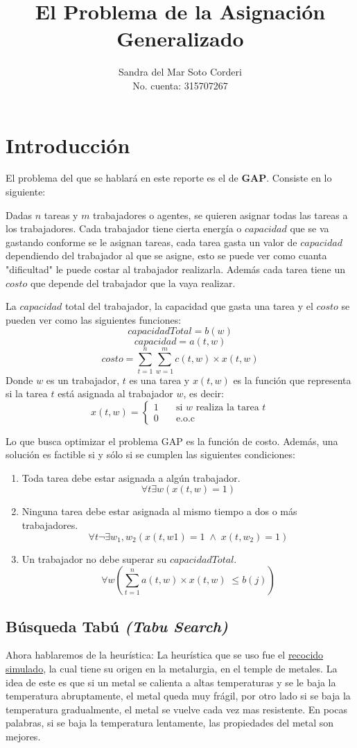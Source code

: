 \documentclass{article}
\title{El Problema de la Asignación Generalizado}
\author{
  Sandra del Mar Soto Corderi\\
  No. cuenta: 315707267
}
\date{}
\begin{document}
\maketitle

\section{Introducción}

El problema del que se hablará en este reporte es el de \textbf{GAP}. Consiste en lo
siguiente:

Dadas $n$ tareas y $m$ trabajadores o agentes, se quieren asignar todas las tareas
a los trabajadores. Cada trabajador tiene cierta energía o $capacidad$ que se va
gastando conforme se le asignan tareas, cada tarea gasta un valor de $capacidad$
dependiendo del trabajador al que se asigne, esto se puede ver como cuanta "dificultad" le puede costar al trabajador realizarla.
Además cada tarea tiene un $costo$ que depende del trabajador que la vaya realizar.

La $capacidad$ total del trabajador, la capacidad que gasta una tarea y el $costo$ 
se pueden ver como las siguientes funciones:
\[capacidadTotal=b(w)\]
\[capacidad=a(t,w)\] 
\[costo=\sum_{t=1}^{n}\sum_{w=1}^{m}c(t,w)\times x(t,w)\]
Donde $w$ es un trabajador, $t$ es una tarea y $x(t,w)$ es la función que 
representa si la tarea $t$ está asignada al trabajador $w$, es decir:
\[x(t,w)=
\begin{cases}
\text{1}&\quad\text{si $w$ realiza la tarea $t$}\\
\text{0}&\quad\text{e.o.c}
\end{cases}\]

Lo que busca optimizar el problema GAP es la función de costo.
Además, una solución es factible si y sólo si se cumplen las siguientes 
condiciones:
\begin{enumerate}
	\item Toda tarea debe estar asignada a algún trabajador.
	\[\forall t \exists w (x(t,w)=1)\]
	\item Ninguna tarea debe estar asignada al mismo tiempo a dos o más 
	trabajadores.
	\[\forall t \neg \exists w_1,w_2 (x(t,w1)=1 \;\wedge \; x(t,w_2)=1)\]
	\item Un trabajador no debe superar su $capacidadTotal$.
	\[\forall w \left(\sum_{t=1}^{n}a(t,w)\times x(t,w) \; \leq b(j)\right)\]
\end{enumerate}

\subsection{Búsqueda Tabú \emph{(Tabu Search)}}
Ahora hablaremos de la heurística: La heurística que se uso fue el \underline{recocido simulado}, la cual tiene su origen en la metalurgia, en el temple de metales. La idea de este es que si un metal se calienta a altas temperaturas y se le baja la temperatura abruptamente, el metal queda muy frágil, por otro lado si se baja la temperatura gradualmente, el metal se vuelve cada vez mas resistente. En pocas palabras, si se baja la temperatura lentamente, las propiedades del metal son mejores.
\end{document}
